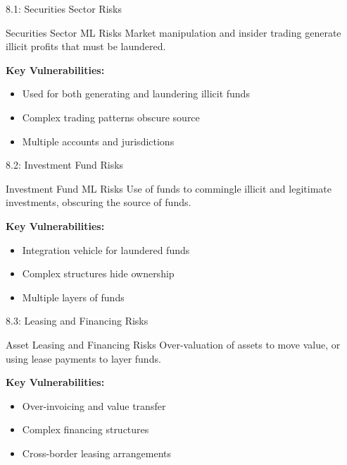 \documentclass{beamer}
\begin{document}
	
	\begin{frame}{8.1: Securities Sector Risks}
		\begin{block}{Securities Sector ML Risks}
			Market manipulation and insider trading generate illicit profits that must be laundered.
		\end{block}
		\textbf{Key Vulnerabilities:}
		\begin{itemize}
			\item Used for both generating and laundering illicit funds
			\item Complex trading patterns obscure source
			\item Multiple accounts and jurisdictions
		\end{itemize}
	\end{frame}
	
	\begin{frame}{8.2: Investment Fund Risks}
		\begin{block}{Investment Fund ML Risks}
			Use of funds to commingle illicit and legitimate investments, obscuring the source of funds.
		\end{block}
		\textbf{Key Vulnerabilities:}
		\begin{itemize}
			\item Integration vehicle for laundered funds
			\item Complex structures hide ownership
			\item Multiple layers of funds
		\end{itemize}
	\end{frame}
	
	\begin{frame}{8.3: Leasing and Financing Risks}
		\begin{block}{Asset Leasing and Financing Risks}
			Over-valuation of assets to move value, or using lease payments to layer funds.
		\end{block}
		\textbf{Key Vulnerabilities:}
		\begin{itemize}
			\item Over-invoicing and value transfer
			\item Complex financing structures
			\item Cross-border leasing arrangements
		\end{itemize}
	\end{frame}
	
\end{document}
